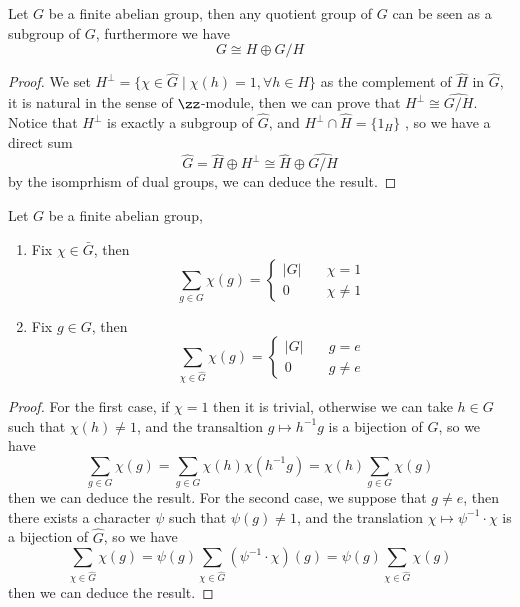 \begin{theorem}
    Let \(G\) be a finite abelian group, then any quotient group of \(G\) can be seen as a subgroup of \(G\), furthermore we have
    \[G \cong H \oplus G/H\]
\end{theorem}

\begin{proof}
    We set \(H^\perp = \{\chi \in \hat{G} \mid \chi(h) = 1, \forall h \in H\}\) as the complement of \(\hat{H}\) in \(\hat{G}\), it is natural in the sense of \(\zz\)-module, then we can prove that \(H^{\perp} \cong\widehat{G/H}\). Notice that \(H^{\perp}\) is exactly a subgroup of \(\hat{G}\), and \(H^\perp \cap \hat{H} = \{1_H\}\) , so we have a direct sum \[\hat{G} = \hat{H} \oplus H^\perp \cong \hat{H} \oplus \widehat{G/H}\]
    by the isomprhism of dual groups, we can deduce the result. 
\end{proof}

\begin{proposition}[orthogonality]
    Let \(G\) be a finite abelian group,
    \begin{enumerate}
        \item Fix \(\chi \in \bar{G}\), then \[\sum_{g \in G} \chi(g) = \begin{cases}
            |G|  \quad &\chi = 1 \\
            0 \quad &\chi \neq 1
        \end{cases}\]
        \item Fix \(g \in G\), then \[\sum_{\chi \in \hat{G}} \chi(g) = \begin{cases}
            |G|  \quad &g = e \\
            0 \quad &g \neq e
        \end{cases}\]
    \end{enumerate}
    
\end{proposition}

\begin{proof}
    For the first case, if \(\chi = 1\) then it is trivial, otherwise we can take \(h \in G\) such that \(\chi(h) \neq 1\), and the transaltion \(g \mapsto h^{-1}g\) is a bijection of \(G\), so we have
    \[\sum_{g\in G}\chi(g) = \sum_{g \in G}\chi(h)\chi(h^{-1}g) = \chi(h) \sum_{g \in G}\chi(g)\]
    then we can deduce the result. For the second case, we suppose that \(g \neq e\), then there exists a character \(\psi\) such that \(\psi(g) \neq 1\), and the translation \(\chi \mapsto \psi^{-1}\cdot \chi\) is a bijection of \(\hat{G}\), so we have
    \[\sum_{\chi \in \hat{G}} \chi(g) = \psi(g) \sum_{\chi \in \hat{G}} (\psi^{-1}\cdot 
    \chi)(g) = \psi(g) \sum_{\chi \in \hat{G}} \chi(g)\]
    then we can deduce the result.
\end{proof}

